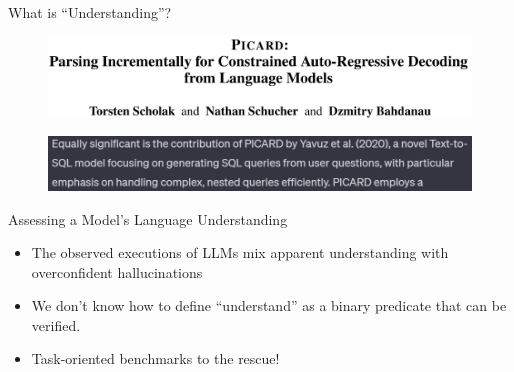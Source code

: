\documentclass{beamer}
\begin{document}
\begin{frame}{What is ``Understanding''?}
    \begin{figure}
        \includegraphics[width=\textwidth]{picard_title.png}
    \end{figure}

    \begin{figure}
        \includegraphics[width=\textwidth]{yavuzetal.png}
    \end{figure}
\end{frame}

\begin{frame}{Assessing a Model's Language Understanding}
    \begin{itemize}
        \item The observed executions of LLMs mix apparent understanding with overconfident \alert{hallucinations}
        \item We don't know how to define ``understand'' as a binary predicate that can be verified.

        \pause

        \item Task-oriented benchmarks to the rescue!
    \end{itemize}
\end{frame}
\end{document}
